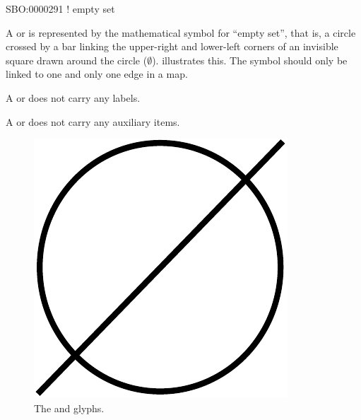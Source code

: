 \begin{glyphDescription}

\glyphSboTerm SBO:0000291 ! empty set

\glyphContainer A  or  is represented by the mathematical symbol for ``empty
set'', that is, a circle crossed by a bar linking the upper-right and
lower-left corners of an invisible square drawn around the circle ($\emptyset$).
 illustrates this.  The symbol should only be linked to one
and only one edge in a map.

\glyphLabel A  or  does not carry any labels.

\glyphAux A  or  does not carry any auxiliary items.  

\end{glyphDescription}

\begin{figure}[H]
  \centering
  \includegraphics[scale = 0.3]{images/sourceSink}
  \caption{The  and  glyphs.}
  \label{fig:sourceSink}
\end{figure}






